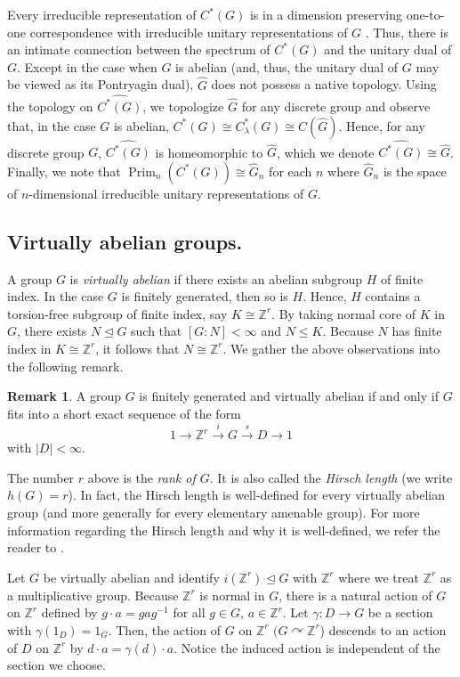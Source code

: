 \documentclass[11pt, twoside]{amsart}
\newcommand{\te}[1]{\operatorname{#1}}
\newcommand{\zn}{\mathbb{Z}}
\newcommand{\wh}{\widehat}
\theoremstyle{definition}
\newtheorem{rmk}[thm]{Remark}
\newcommand{\B}{\mathbb}
\newcommand{\Z}{\B{Z}}
\begin{document}
Every irreducible representation of $C^*(G)$ is in a dimension preserving one-to-one correspondence with irreducible unitary representations of $G$ \cite[Ch. VII]{Dav96}. Thus, there is an intimate connection between the spectrum of $C^*(G)$ and the unitary dual of $G$. Except in the case when $G$ is abelian (and, thus, the unitary dual of $G$ may be viewed as its Pontryagin dual), $\wh{G}$ does not possess a native topology. Using the topology on $\wh{C^*(G)}$, we topologize $\wh{G}$ for any discrete group and observe that, in the case $G$ is abelian, $C^*(G)\cong C_{\lambda}^*(G)\cong C(\widehat{G})$. Hence, for any discrete group $G$, $\wh{C^*(G)}$ is homeomorphic to $\wh{G}$, which we denote $\wh{C^*(G)}\cong \wh{G}$. Finally, we note that $\te{Prim}_n(C^*(G))\cong \wh{G}_n$ for each $n$ where $\wh{G}_n$ is the space of $n$-dimensional irreducible unitary representations of $G$.



\subsection{Virtually abelian groups.} A group $G$ is \emph{virtually abelian} if there exists an abelian subgroup $H$ of finite index. In the case $G$ is finitely generated, then so is $H$. Hence, $H$ contains a torsion-free subgroup of finite index, say $K\cong\Z^r$. By taking normal core of $K$ in $G$, there exists $N\unlhd G$ such that $[G:N]<\infty$ and $N\leq K$. Because $N$ has finite index in $K\cong \Z^r$, it follows that $N\cong \Z^r$. We gather the above observations into the following remark.
\begin{rmk}\label{virtually_abelian_general_form}
    A group $G$ is finitely generated and virtually abelian if and only if $G$ fits into a short exact sequence of the form
    \begin{equation}\label{eqn:virtually_abelian_defn}
         1\rightarrow \Z^r\stackrel{i}{\rightarrow} G\stackrel{s}{\rightarrow}D\rightarrow 1
    \end{equation}
    with $|D|<\infty$. 
\end{rmk}

The number $r$ above is the {\em rank of $G$}. It is also called the \emph{Hirsch length} (we write $h(G)=r$). In fact, the Hirsch length is well-defined for every virtually abelian group (and more generally for every elementary amenable group). For more information regarding the Hirsch length and why it is well-defined, we refer the reader to \cite{hillman_finite_Hirsch_length_old}. \par
Let $G$ be virtually abelian and identify $i(\zn^r)\unlhd  G$ with $\zn^r$ where we treat $\zn^r$ as a multiplicative group. Because $\zn^r$ is normal in $G$, there is a natural action of $G$ on $\Z^r$ defined by $g\cdot a=gag^{-1}$ for all $g\in G$, $a\in \Z^r$. Let $\gamma:D\rightarrow G$ be a section with $\gamma(1_D)=1_G$. Then, the action of $G$ on $\Z^r$ $(G\curvearrowright \Z^r$) descends to an action of $D$ on $\Z^r$ by $d\cdot a=\gamma(d)\cdot a$. Notice the induced action is independent of the section we choose. 
\end{document}
